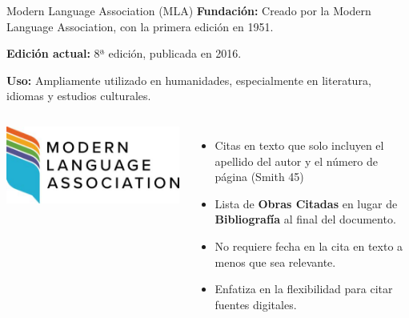 \documentclass[
11pt, %
]{beamer}
\begin{document}
\begin{frame}{Modern Language Association (MLA)}
	\textbf{Fundación:} Creado por la Modern Language Association, con la primera edición en 1951.

	\textbf{Edición actual:} 8ª edición, publicada en 2016.

	\textbf{Uso:} Ampliamente utilizado en humanidades, especialmente en literatura, idiomas y estudios culturales.

	\begin{columns}[T] %
		\centering
		\includegraphics[width=\textwidth]{mla logo.jpeg} %
		\vspace{0.5cm}
		\begin{itemize}
			\item Citas en texto que solo incluyen el apellido del autor y el número de página (Smith 45)
			\item Lista de \textbf{Obras Citadas} en lugar de \textbf{Bibliografía} al final del documento.
			\item No requiere fecha en la cita en texto a menos que sea relevante.
			\item Enfatiza en la flexibilidad para citar fuentes digitales.
		\end{itemize}
	\end{columns}
\end{frame}
\end{document}
